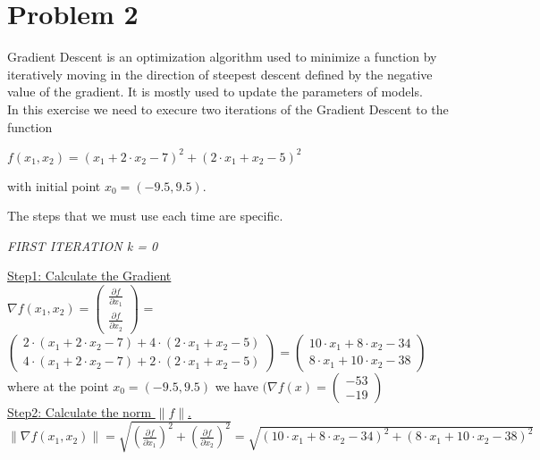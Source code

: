 
\section{Problem 2}
Gradient Descent is an optimization algorithm used to minimize a function by iteratively moving in the direction of steepest descent defined by the negative value of the gradient. It is mostly used to update the parameters of models.\\
In this exercise we need to execure two iterations of the Gradient Descent to the function
\begin{center}
$	f(x_1,x_2) = (x_1+2 \cdot x_2 - 7)^2 + (2 \cdot x_1 + x_2 -5)^2$
\end{center}
with initial point $x_0 = (-9.5,9.5)$.

The steps that we must use each time are specific.
\begin{center}
	\textit{FIRST ITERATION k = 0}
\end{center}

\underline{Step1: Calculate the Gradient}\\

\(\nabla f(x_1,x_2) = \left(\begin{array}{c}
	\frac{\partial f}{\partial x_1} \\[1mm]
	\frac{\partial f}{\partial x_2}
\end{array}\right)\) = $\left(\begin{array}{c}
 2 \cdot (x_1 + 2 \cdot x_2 - 7) + 4 \cdot (2 \cdot x_1 + x_2 -5)\\[1mm]
4 \cdot (x_1 + 2 \cdot x_2 -7) + 2 \cdot (2 \cdot x_1 + x_2 - 5)
\end{array}\right) = \left(\begin{array}{c}
10 \cdot x_1 + 8 \cdot x_2 - 34\\[1mm]
8 \cdot x_1 + 10 \cdot x_2 -38
\end{array}\right)$ \\[3mm]

where at the point $x_0 = (-9.5,9.5)$ we have $(\nabla f(x) = \left(\begin{array}{c}
	-53 \\
	-19
\end{array}\right)$
\\[4mm]

\underline{Step2: Calculate the norm \(\|f\|\).}\\

\(\|\nabla f(x_1,x_2)\| = \sqrt{\left(\frac{\partial f}{\partial x_1}\right)^2 + \left(\frac{\partial f}{\partial x_2}\right)^2} = \sqrt{\left(10 \cdot x_1 + 8 \cdot x_2 - 34\right)^2 + \left(8 \cdot x_1 + 10 \cdot x_2 -38\right)^2}\) \\[2mm]

